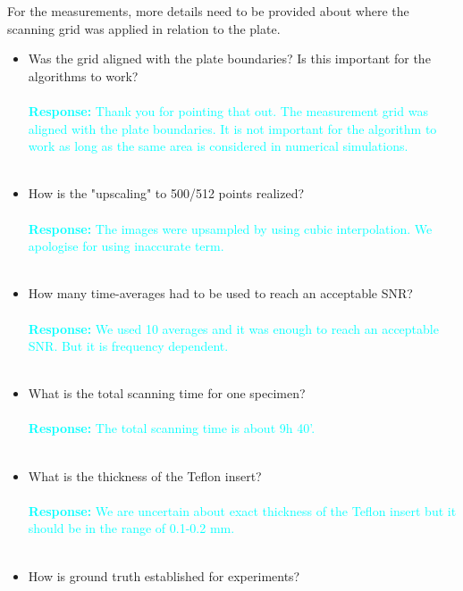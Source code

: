 \documentclass[11pt,a2paper]{report}
\begin{document}
	For the measurements, more details need to be provided about where the scanning grid was applied in relation to the plate. 
	\begin{itemize}
		\item Was the grid aligned with the plate boundaries? Is this important for the algorithms to work?
			\\ \\
		\textcolor{Cyan}{
			\textbf{Response:}
		Thank you for pointing that out. The measurement grid was aligned with the plate boundaries. It is not important for the algorithm to work as long as the same area is considered in numerical simulations.}
		\\ \\
		\item How is the "upscaling" to 500/512 points realized?
			\\ \\
		\textcolor{Cyan}{
			\textbf{Response:}
		The images were upsampled by using cubic interpolation.
	    We apologise for using inaccurate term.}
		\\ \\
		\item How many time-averages had to be used to reach an acceptable SNR?
			\\ \\
		\textcolor{Cyan}{
			\textbf{Response:}
		We used 10 averages and it was enough to reach an acceptable SNR.
	    But it is frequency dependent.}
		\\ \\
		\item What is the total scanning time for one specimen?
			\\ \\
		\textcolor{Cyan}{
			\textbf{Response:}
		The total scanning time is about 9h 40'.}
		\\ \\
		\item What is the thickness of the Teflon insert?
			\\ \\
		\textcolor{Cyan}{
			\textbf{Response:}
		We are uncertain about exact thickness of the Teflon insert but it should be in the range of 0.1-0.2 mm.
	    }
		\\ \\
		\item How is ground truth established for experiments?
			\\ \\
		\textcolor{Cyan}{
}
\end{itemize}
\end{document}
